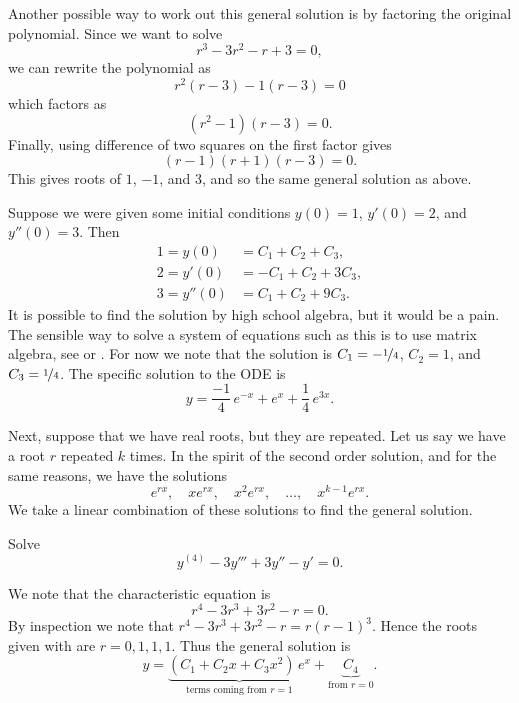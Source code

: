 \begin{exampleSol}
Another possible way to work out this general solution is by factoring the original polynomial.
Since we want to solve 
\[ r^3 - 3r^2 - r + 3 = 0,\] 
we can rewrite the polynomial as
\[ r^2(r-3) -1(r-3) = 0 \] which factors as
\[ (r^2 - 1)(r-3) = 0. \] Finally, using difference of two squares on the first factor gives
\[ (r-1)(r+1)(r-3) = 0 .\] This gives roots of $1$, $-1$, and $3$, and so the same general solution as above.

Suppose we were given some initial conditions $y(0) = 1$, $y'(0) = 2$,
and $y''(0) = 3$.  Then
\begin{align*}
1 = y(0) & = C_1 + C_2 + C_3 , \\
2 = y'(0) & = -C_1 + C_2 + 3C_3 , \\
3 = y''(0) & = C_1 + C_2 + 9C_3 .
\end{align*}
It is possible to find the solution by high school algebra, but it would be a
pain.
The sensible way to solve a system of equations such as this is to use
matrix algebra, see
 or .
For now we note that the solution is $C_1 =
-\nicefrac{1}{4}$,
$C_2 = 1$, and $C_3 = \nicefrac{1}{4}$.  The specific solution
to the ODE is
\begin{equation*}
y = \frac{-1}{4}\, e^{-x} + e^x + \frac{1}{4}\, e^{3x} .
\end{equation*}
\end{exampleSol}


Next, suppose that we have real roots, but they are repeated.  Let us say
we have
a root $r$ repeated $k$ times.  In the spirit of the second
order solution, and for the same reasons, we have the solutions
\begin{equation*}
e^{rx}, \quad xe^{rx}, \quad x^2 e^{rx}, \quad \ldots, \quad x^{k-1} e^{rx} .
\end{equation*}
We take a linear combination of these solutions to find the general
solution.

\begin{example}
Solve
\begin{equation*}
y^{(4)} - 3 y''' + 3 y'' - y' =  0 .
\end{equation*}
\end{example}

\begin{exampleSol}
We note that the characteristic equation is
\begin{equation*}
r^4 - 3r^3 + 3r^2 -r = 0 .
\end{equation*}
By inspection we note that $r^4 - 3r^3 + 3r^2 -r = r{(r-1)}^3$.  Hence
the roots given with  are $r = 0, 1, 1, 1$.  Thus the general
solution is
\begin{equation*}
y = \underbrace{(C_1 + C_2 x + C_3 x^2)\, e^x}_{\text{terms coming from }
r=1} + \underbrace{C_4}_{\text{from } r=0} .
\end{equation*}
\end{exampleSol}

